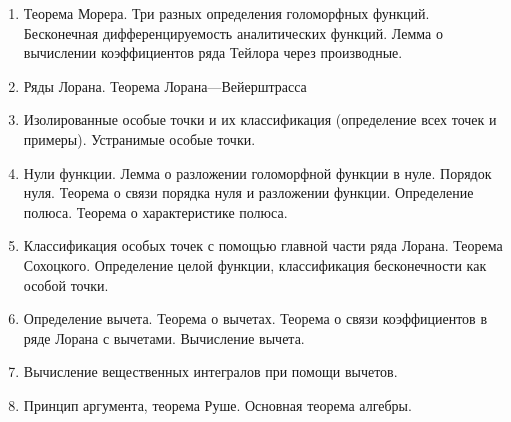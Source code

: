 \begin{enumerate}
\item Теорема Морера. Три разных определения голоморфных функций. Бесконечная дифференцируемость аналитических функций. Лемма о вычислении коэффициентов ряда Тейлора через производные.
\item Ряды Лорана. Теорема Лорана—Вейерштрасса
\item Изолированные особые точки и их классификация (определение всех точек и примеры). Устранимые особые точки.
\item Нули функции. Лемма о разложении голоморфной функции в нуле. Порядок нуля. Теорема о связи порядка нуля и разложении функции. Определение полюса. Теорема о характеристике полюса.
\item Классификация особых точек с помощью главной части ряда Лорана. Теорема Сохоцкого. Определение целой функции, классификация бесконечности как особой точки.
\item Определение вычета. Теорема о вычетах. Теорема о связи коэффициентов в ряде Лорана с вычетами. Вычисление вычета.
\item Вычисление вещественных интегралов при помощи вычетов.
\item Принцип аргумента, теорема Руше. Основная теорема алгебры.
\end{enumerate}